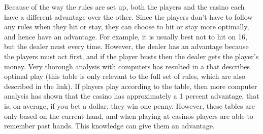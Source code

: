  \vspace{0.2cm}

 \vspace{0.2cm}

Because of the way the rules are set up, both the players and the casino each have a different advantage over the other. Since the players don't have to follow any rules when they hit or stay, they can choose to hit or stay more optimally, and hence have an advantage. For example, it is usually best not to hit on 16, but the dealer must every time. However, the dealer has an advantage because the players must act first, and if the player busts then the dealer gets the player's money. Very thorough analysis with computers has resulted in a  that describes optimal play (this table is only relevant to the full set of rules, which are also described in the link). If players play according to the table, then more computer analysis has shown that the casino has approximately a 1 percent advantage, that is, on average, if you bet a dollar, they win one penny. However, these tables are only based on the current hand, and when playing at casinos players are able to remember past hands. This knowledge can give them an advantage. \\

